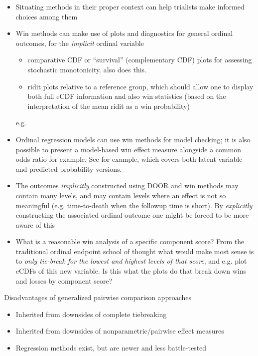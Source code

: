 \documentclass[
  11pt,
  fleqn
]{article}
\begin{document}
\begin{itemize}
  \item Situating methods in their proper context can help
    trialists make informed choices among them
  \item Win methods can make use of
    plots and diagnostics for general ordinal outcomes, for the
    \emph{implicit}
    ordinal variable
    \begin{itemize}
      \item comparative CDF or ``survival''
        (complementary CDF) plots for assessing stochastic
        monotonicity. \citet{follmannAnalysisOrderedComposite2020}
        also does this.
      \item ridit plots
        \citep{brossHowUseRidit1958,jansenRiditAnalysisReview1984}
        relative to a
        reference group, which should allow one to display both full
        eCDF information
        and also win statistics (based on the interpretation of the
          mean ridit as a win
        probability)
    \end{itemize}e.g.
  \item Ordinal regression models can use win
    methods for model checking; it is also possible to present a
    model-based win
    effect measure alongside a common odds ratio for example. See
    \citep{agrestiOrdinalProbabilityEffect2017} for example,
    which covers both
    latent variable and predicted probability versions.
  \item The outcomes
    \emph{implicitly} constructed using DOOR and win methods may
    contain many
    levels, and may contain levels where an effect is not so
    meaningful (e.g.
    time-to-death when the followup time is short). By \emph{explicitly}
    constructing the associated ordinal outcome one might be
    forced to be more
    aware of this
  \item What is a reasonable win analysis of a specific component
    score? From the traditional ordinal endpoint school of thought
    what would make
    most sense is to \emph{only tie-break for the lowest and highest
      levels of that
    score}, and e.g. plot eCDFs of this new variable. Is this
    what the plots do
    that break down wins and losses by component score?
\end{itemize}

Disadvantages of generalized pairwise comparison approaches
\begin{itemize}
  \item Inherited from downsides of complete tiebreaking
  \item Inherited from downsides of nonparametric/pairwise effect measures
  \item Regression methods exist, but are newer and less battle-tested
\end{itemize}
\end{document}
